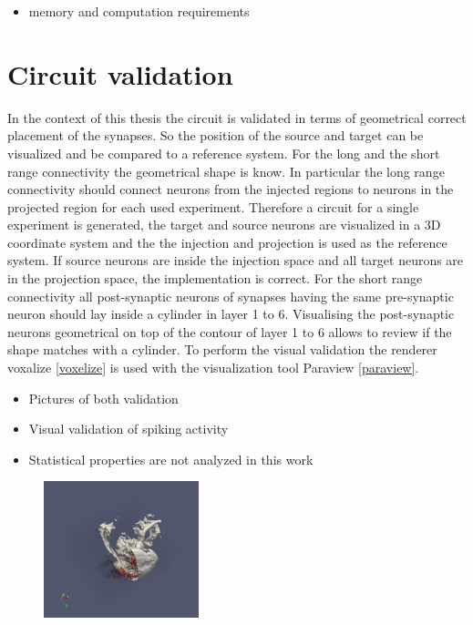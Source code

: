 \begin{itemize}
      \item memory and computation requirements
\end{itemize}


\newpage
\section{Circuit validation}

In the context of this thesis the circuit is validated in terms of geometrical correct placement of
the synapses. So the position of the source and target can be visualized and be compared to a 
reference system. For the long and the short range connectivity the geometrical shape is know.
In particular the long range connectivity should connect neurons from the injected regions to neurons
in the projected region for each used experiment. Therefore a circuit for a single experiment is 
generated, the target and source neurons are visualized in a 3D coordinate system and the the injection
and projection is used as the reference system. If source neurons are inside the injection space and all
target neurons are in the projection space, the implementation is correct.
For the short range connectivity all post-synaptic neurons of synapses having the same pre-synaptic neuron should
lay inside a cylinder in layer 1 to 6. Visualising the post-synaptic neurons geometrical on top of the contour of layer 1 to 6 allows to review if the shape matches with a cylinder.
To perform the visual validation the renderer voxalize \ref{voxelize} is used with the visualization tool Paraview \ref{paraview}.
 
\begin{itemize}
      \item Pictures of both validation
      \item Visual validation of spiking activity
      \item Statistical properties are not analyzed in this work 
\end{itemize}

\begin{figure}[ht!]
\centering
\includegraphics[width=0.4\textwidth]{pictures/paraview_ex.png}
\end{figure}

